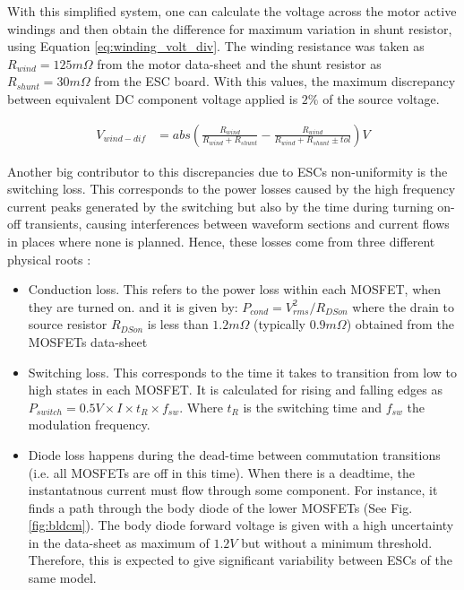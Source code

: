 With this simplified system, one can calculate the voltage across the motor active windings and then obtain the difference for maximum variation in shunt resistor, using Equation \ref{eq:winding_volt_div}. The winding resistance was taken as $R_{wind}=125m\Omega$ from the motor data-sheet \cite{KDE-Direct2020} and the shunt resistor as $R_{shunt}=30m\Omega$ from the ESC board. With this values, the maximum discrepancy between equivalent DC component voltage applied is $2\%$ of the source voltage.

\begin{equation}
\begin{split}
 V_{wind-dif} &= abs\left(\frac{R_{wind}}{R_{wind}+R_{shunt}}-\frac{R_{wind}}{R_{wind}+R_{shunt}\pm tol}\right)V 
\end{split} 
\label{eq:winding_volt_div}   
\end{equation}

Another big contributor to this discrepancies due to ESCs non-uniformity is the switching loss. This corresponds to the power losses caused by the high frequency current peaks generated by the switching but also by the time during turning on-off transients, causing interferences between waveform sections and current flows in places where none is planned. Hence, these losses come from three different physical roots \cite{Keskar,Kahrimanovic2016}:

\begin{itemize}
	\item Conduction loss. This refers to the power loss within each MOSFET, when they are turned on. and it is given by: $P_{cond}=V_{rms}^2/R_{DSon}$ where the drain to source resistor $R_{DSon}$ is less than $1.2m\Omega$ (typically $0.9m\Omega$) obtained from the MOSFETs data-sheet \cite{Infineon2016}
	\item Switching loss. This corresponds to the time it takes to transition from low to high states in each MOSFET. It is calculated for rising and falling edges as  $P_{switch}=0.5V\times I\times t_R\times f_{sw}$. Where $t_R$ is the switching time and $f_{sw}$ the modulation frequency.
	\item Diode loss happens during the dead-time between commutation transitions (i.e. all MOSFETs are off in this time). When there is a deadtime, the instantatnous current must flow through some component. For instance, it finds a path through the body diode of the lower MOSFETs (See Fig. \ref{fig:bldcm}). The body diode forward voltage is given with a high uncertainty in the data-sheet as maximum of $1.2V$ \cite{Infineon2016} but without a minimum threshold. Therefore, this is expected to give significant variability between ESCs of the same model.

\end{itemize}


